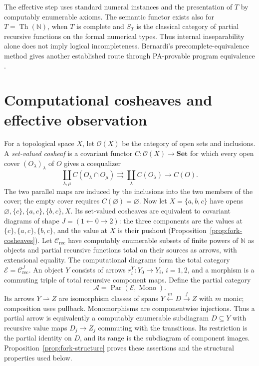 \documentclass[11pt]{article}
\newcommand{\N}{\mathbb N}
\begin{document}
The effective step uses standard numeral instances and the presentation
of $T$ by computably enumerable axioms. The semantic functor exists also
for $T=\operatorname{Th}(\N)$, when $T$ is complete and $S_T$ is the
classical category of partial recursive functions on the formal numerical
types. Thus internal inseparability alone does not imply logical
incompleteness. Bernardi's precomplete-equivalence method gives another
established route through PA-provable program equivalence
\cite[pp.~125--128]{Bernardi}.

\section{Computational cosheaves and effective observation}\label{sec:cosheaves}

For a topological space $X$, let $\mathcal O(X)$ be the category
of open sets and inclusions. A \emph{set-valued cosheaf} is a
covariant functor $C:\mathcal O(X)\to\mathbf{Set}$ for which
every open cover $(O_\lambda)_\lambda$ of $O$ gives a coequalizer
\[
 \coprod_{\lambda,\mu} C(O_\lambda\cap O_\mu)
 \rightrightarrows \coprod_\lambda C(O_\lambda)
 \longrightarrow C(O).
\]
The two parallel maps are induced by the inclusions into the two
members of the cover; the empty cover requires
$C(\varnothing)=\varnothing$.
Now let $X=\{a,b,c\}$ have opens
$\varnothing,\{c\},\{a,c\},\{b,c\},X$.
Its set-valued cosheaves are equivalent to covariant diagrams of shape
$J=(1\leftarrow0\to2)$: the three components are the values at
$\{c\},\{a,c\},\{b,c\}$, and the value at $X$ is their pushout
(Proposition~\ref{prop:fork-cosheaves}).
Let $\mathcal C_{\mathrm{rec}}$ have computably enumerable subsets
of finite powers of $\N$ as objects and partial recursive functions
total on their sources as arrows, with extensional equality.
The computational diagrams form the total category
$\mathcal E=\mathcal C_{\mathrm{rec}}^J$.
An object $Y$ consists of arrows $r_i^Y:Y_0\to Y_i$, $i=1,2$,
and a morphism is a commuting triple of total recursive component maps.
Define the partial category
\[
 \mathcal A=\operatorname{Par}(\mathcal E,\operatorname{Mono}).
\]
Its arrows $Y\rightharpoonup Z$ are isomorphism classes of spans
$Y\xleftarrow{m}D\xrightarrow{f}Z$ with $m$ monic; composition
uses pullback. Monomorphisms are componentwise injections.
Thus a partial arrow is equivalently a computably enumerable
subdiagram $D\subseteq Y$ with recursive value maps $D_j\to Z_j$
commuting with the transitions. Its restriction is the partial
identity on $D$, and its range is the subdiagram of component images.
Proposition~\ref{prop:fork-structure} proves these assertions and
the structural properties used below.
\end{document}
